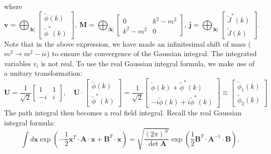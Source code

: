 where
\begin{equation*}
	\mathbf v = \bigoplus_{|\mathbf k|} \left[
	\begin{array}{c}
		\tilde{\phi}(k) \\ 
		\tilde{\phi}^*(k) 
	\end{array}\right],\ 
	\mathbf M = \bigoplus_{|\mathbf k|} \left[
	\begin{array}{cc} 
		0 & k^2-m^2 \\ 
		k^2-m^2 & 0 
	\end{array}\right],\ 
	\mathbf j = \bigoplus_{|\mathbf k|} \left[
	\begin{array}{c}
		\tilde{J}^*(k) \\ 
		\tilde{J}(k) 
	\end{array}\right].
\end{equation*}
Note that in the above expression, we have made an infinitesimal shift of mass ($m^2 \rightarrow m^2 - i\epsilon$) to ensure the convergence of the Gaussian integral.
The integrated variables $v_i$ is not real.
To use the real Gaussian integral formula, we make use of a unitary transformation: 
\begin{equation*}
	\mathbf U = \frac{1}{\sqrt 2} \left[\begin{array}{cc}
		1 & 1 \\
		-i & i
	\end{array}\right], \quad
	\mathbf U \cdot \left[
	\begin{array}{c}
		\tilde{\phi}(k) \\ 
		\tilde{\phi}^*(k) 
	\end{array}\right] 
	= \frac{1}{\sqrt 2}\left[
	\begin{array}{c}
		\tilde\phi(k)+\tilde\phi^*(k) \\ 
		-i\tilde\phi(k)+i\tilde\phi^*(k)
	\end{array}\right]
	\equiv \left[
	\begin{array}{c}
		\tilde\phi_1(k) \\ 
		\tilde\phi_2(k) 
	\end{array}\right]
\end{equation*}
The path integral then becomes a real field integral.
Recall the real Gaussian integral formula:
\begin{equation}
	\int d\mathbf x \exp\left(-\frac{1}{2}\mathbf{x}^T \cdot \mathbf A \cdot \mathbf{x} + \mathbf{B}^T \cdot \mathbf{x}\right) 
	= \sqrt{\frac{(2\pi)^N}{\det{\mathbf A}}}\exp\left(\frac{1}{2}\mathbf{B}^T \cdot \mathbf{A}^{-1} \cdot \mathbf{B}\right),
	\label{eq:real-gaussian-integral}
\end{equation}
